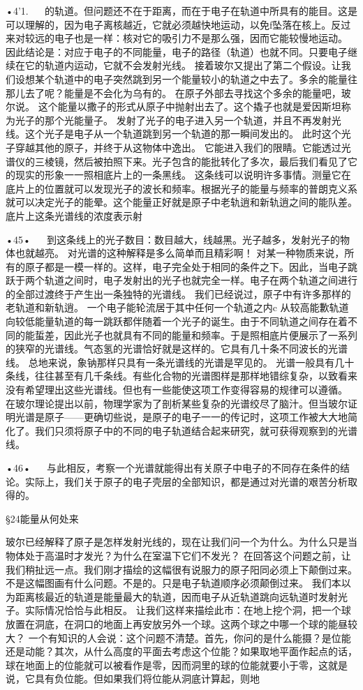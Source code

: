 •4'1.
  
的轨道。但问题还不在于距离，而在于电子在轨道中所具有的能目。这是可以理解的，因为电子离核越近，它就必须越快地运动，以免f坠落在核上。反过来对较远的电子也是一样：核对它的吸引力不是那么强，因而它能较慢地运动。
因此结论是：对应于电子的不同能量，电子的路径（轨道）也就不同。只要电子继续在它的轨道内运动，它就不会发射光线。
接着玻尔又提出了第二个假设。让我们设想某个轨道中的电子突然跳到另一个能量较小的轨道之中去了。多余的能量往那儿去了呢？能量是不会化为乌有的。
在原子外部去寻找这个多余的能量吧，玻尔说。
这个能量以撒子的形式从原子中抛射出去了。这个撬子也就是爱因斯坦称为光子的那个光能量子。
发射了光子的电子进入另一个轨道，并且不再发射光线。这个光子是电子从一个轨道跳到另一个轨道的那一瞬间发出的。
此时这个光子穿越其他的原子，并终于从这物体中逸出。
它能进入我们的限睛。它能透过光谱仪的三棱镜，然后被拍照下来。光子包含的能批转化了多次，最后我们看见了它的现实的形象一一照相底片上的一条黑线。
这条线可以说明许多事情。测量它在底片上的位置就可以发现光子的波长和频率。根据光子的能量与频率的普朗克义系就可以决定光子的能晕。这个能量正好就是原子中老轨逍和新轨逍之间的能队差。底片上这条光谱线的浓度表示射

•45•
  
到这条线上的光子数目：数目越大，线越黑。光子越多，发射光子的物体也就越亮。
对光谱的这种解释是多么简单而且精彩啊！
对某一种物质来说，所有的原子都是一模一样的。这样，电子完全处于相同的条件之下。因此，当电子跳跃于两个轨道之间时，电子发射出的光子也就完全一样。电子在两个轨道之间进行的全部过渡终于产生出一条独特的光谱线。
我们已经说过，原子中有许多那样的老轨道和新轨逍。
一个电子能轮流居于其中任何一个轨道之内c
从较高能歉轨道向较低能量轨道的每一跳跃都伴随着一个光子的诞生。由于不同轨道之间存在着不同的能蜇差，因此光子也就具有不同的能量和频率。于是照相底片便展示了一系列的狭窄的光谱线。气态氢的光谱恰好就是这样的。它具有几十条不同波长的光谱线。
总地来说，象钠那样只具有一条光谱线的光谱是罕见的。
光谱一般具有几十条线，往往甚至有几千条线。有些化合物的光谱图样是那样地错综复杂，以致看来没有希望理出这些光谱线。但也有一些能使这项工作变得容易的规律可以遵循。
在玻尔理论提出以前，物理学家为了剖析某些复杂的光谱绞尽了脑汁。但当玻尔证明光谱是原子——更确切些说，是原子的电子一一的传记时，这项工作被大大地简化了。我们只须将原子中的不同的电子轨道结合起来研究，就可获得观察到的光谱线。

•46•
  
与此相反，考察一个光谱就能得出有关原子中电子的不同存在条件的结论。实际上，我们关于原子的电子壳层的全部知识，都是通过对光谱的艰苦分析取得的。

§24能量从何处来

玻尔已经解释了原子是怎样发射光线的，现在让我们问一个为什么。为什么只是当物体处于高温时才发光？为什么在室温下它们不发光？
在回答这个问题之前，让我们稍扯远一点。我们刚才描绘的这幅很有说服力的原子阳同必须上下颠倒过来。不是这幅图画有什么问题。不是的。只是电子轨道顺序必须颠倒过来。
我们本以为距离核最近的轨道是能量最大的轨道，因而电子从近轨道跳向远轨道时发射光子。实际情况恰恰与此相反。
让我们这样来描绘此市：在地上挖个洞，把一个球放置在洞底，在洞口的地面上再安放另外一个球。这两个球之中哪一个球的能昼较大？
一个有知识的人会说：这个问题不清楚。首先，你问的是什么能摄？是位能还是动能？其次，从什么高度的平面去考虑这个位能？如果取地平面作起点的话，球在地面上的位能就可以被看作是零，因而洞里的球的位能就要小于零，这就是说，它具有负位能。但如果我们将位能从洞底计算起，则地

